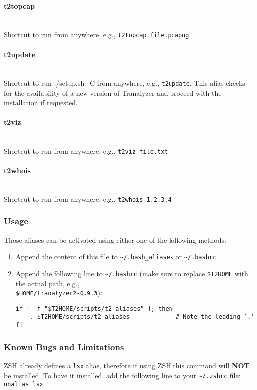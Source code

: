 \documentclass[documentation]{subfiles}
\begin{document}
\paragraph{t2topcap}~\\
Shortcut to run  from anywhere, e.g., {\tt t2topcap file.pcapng}
\paragraph{t2update}~\\
Shortcut to run {./setup.sh --C} from anywhere, e.g., {\tt t2update}.
This alias checks for the availability of a new version of Tranalyzer and proceed with the installation if requested.
\paragraph{t2viz}~\\
Shortcut to run  from anywhere, e.g., {\tt t2viz file.txt}
\paragraph{t2whois}~\\
Shortcut to run  from anywhere, e.g., {\tt t2whois 1.2.3.4}

\subsubsection{Usage}
Those aliases can be activated using either one of the following methods:

\begin{enumerate}
    \item Append the content of this file to {\tt\textasciitilde{}/.bash\_aliases} or {\tt\textasciitilde{}/.bashrc}
    \item Append the following line to {\tt\textasciitilde{}/.bashrc} (make sure to replace {\tt\$T2HOME}
          with the actual path, e.g.,\\{\tt\$HOME/tranalyzer2-0.9.3}):
\begin{lstlisting}
if [ -f "$T2HOME/scripts/t2_aliases" ]; then
    . $T2HOME/scripts/t2_aliases             # Note the leading `.'
fi
\end{lstlisting}
\end{enumerate}

\subsubsection{Known Bugs and Limitations}
ZSH already defines a {\tt lsx} alias, therefore if using ZSH this command will {\bf NOT} be installed.
To have it installed, add the following line to your {\tt \textasciitilde{}/.zshrc} file: {\tt unalias lsx}
\end{document}
